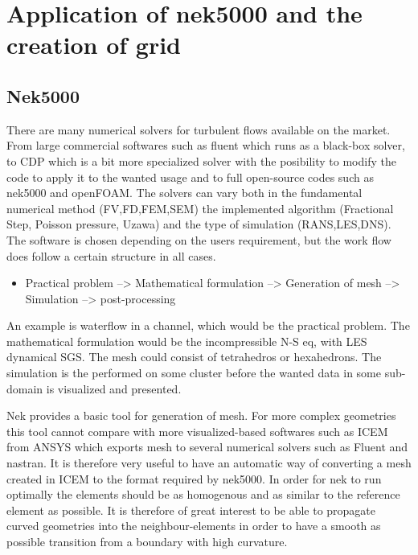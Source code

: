
\chapter{Application of nek5000 and the creation of grid} %

\label{problem} %


\section{Nek5000}

There are many numerical solvers for turbulent flows available on the market. From large commercial softwares such as fluent which runs as a 
black-box solver, to CDP which is a bit more specialized solver with the posibility to modify the code to apply it to the wanted usage and 
to full open-source codes such as nek5000 and openFOAM. The solvers can vary both in the fundamental numerical method (FV,FD,FEM,SEM) 
the implemented algorithm (Fractional Step, Poisson pressure, Uzawa) and the type of simulation (RANS,LES,DNS). 
The software is chosen depending on the users requirement, but the work flow does follow a certain structure in all cases. 

\begin{itemize}
	\item Practical problem --> Mathematical formulation --> Generation of mesh --> Simulation --> post-processing
\end{itemize}
An example is waterflow in a channel, which would be the practical problem. The mathematical formulation would be the incompressible N-S eq, 
with LES dynamical SGS. The mesh could consist of tetrahedros or hexahedrons. The simulation is the performed on some cluster before the 
wanted data in some sub-domain is visualized and presented. 

Nek provides a basic tool for generation of mesh. For more complex geometries this tool cannot compare with more visualized-based softwares 
such as ICEM from ANSYS which exports mesh to several numerical solvers such as Fluent and nastran.
It is therefore very useful to have an automatic way of converting a mesh created in ICEM to the format required by nek5000. 
In order for nek to run optimally the elements should be as homogenous and as similar to the reference element as possible. 
It is therefore of great interest to be able to propagate curved geometries into the neighbour-elements in order to have a smooth as 
possible transition from a boundary with high curvature.

